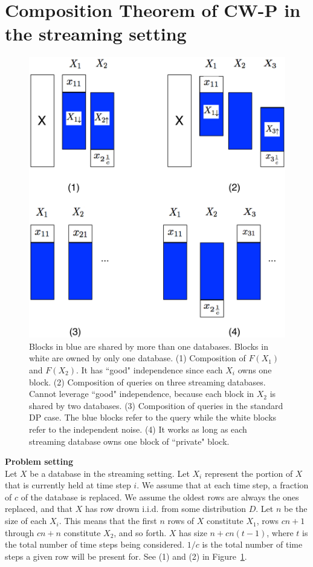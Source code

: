 \documentclass[11pt]{article}
\begin{document}
\section{Composition Theorem of CW-P in the streaming setting}
\begin{figure}[th]
\centering
\includegraphics[width=4.8in]{fig/stream_database1.pdf}
\caption{\label{stream_db1} Blocks in blue are shared by more than one databases. Blocks in white are owned by only one database. (1) Composition of $F(X_{1})$ and $F(X_{2})$. It has ``good" independence since each $X_{i}$ owns one block. (2) Composition of queries on three streaming databases. Cannot leverage ``good" independence, because each block in $X_{2}$ is shared by two databases. (3) Composition of queries in the standard DP case. The blue blocks refer to the query while the white blocks refer to the independent noise. (4) It works as long as each streaming database owns one block of ``private" block.}
\end{figure}
{\bf Problem setting} \\
Let $X$ be a database in the streaming setting. Let $X_{i}$ represent the portion of $X$ that is currently held at time step $i$. We assume that at each time step, a fraction of $c$ of the database is replaced. We assume the oldest rows are always the ones replaced, and that $X$ has row drown i.i.d. from some distribution $D$. Let $n$ be the size of each $X_{i}$. This means that the first $n$ rows of $X$ constitute $X_{1}$, rows $cn+1$ through $cn+n$ constitute $X_{2}$, and so forth. $X$ has size $n+cn(t-1)$, where $t$ is the total number of time steps being considered. $1/c$ is the total number of time steps a given row will be present for. See (1) and (2) in Figure~\ref{stream_db1}. 
\end{document}
